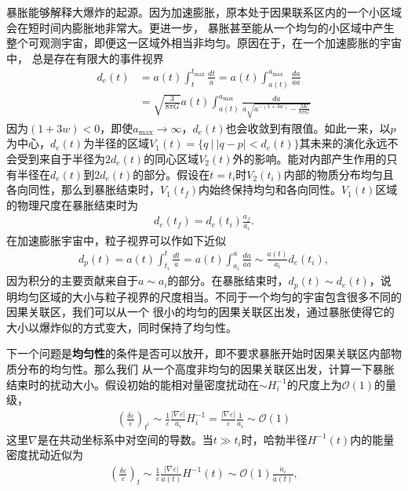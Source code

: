 暴胀能够解释大爆炸的起源。因为加速膨胀，原本处于因果联系区内的一个小区域会在短时间内膨胀地非常大。更进一步，
暴胀甚至能从一个均匀的小区域中产生整个可观测宇宙，即便这一区域外相当非均匀。原因在于，在一个加速膨胀的宇宙中，
总是存在有限大的事件视界
\begin{equation}
  \begin{split}
    d_{e}(t) &= a(t)\int_t^{t_{\text{max}}} \frac{dt}{a}
    =a(t)\int_{a(t)}^{a_{\text{max}}} \frac{da}{\dot{a}a} \\
    &= \sqrt{\frac{3}{8\pi G}}a(t)\int_{a(t)}^{a_{\text{max}}}
    \frac{da}{a\sqrt{a^{-(1+3w)}-\frac{3K}{8\pi G}}} 
  \end{split}
\end{equation}
因为${\left(1+3w\right)}<0$，即使$a_{\text{max}}\rightarrow
\infty$，$d_{e}(t)$也会收敛到有限值。如此一来，以$
p$为中心，$d_{e}(t)$为半径的区域$V_1(t)=\{q\ |\
|q-p|<d_{e}(t)\}$其未来的演化永远不会受到来自于半径为$2d_{e}(t)$的同心区域$V_2(t)$外的影响。能对内部产生作用的只有半径在$d_{e}(t)$到$2d_{e}(t)$的部分。假设在$t=t_{i}$时$V_2(t_{i})$内部的物质分布均匀且各向同性，那么到暴胀结束时，$V_1(t_{f})$内始终保持均匀和各向同性。$V_1(t)$区域的物理尺度在暴胀结束时为
\begin{align}
  d_{e}(t_{f})=d_e(t_{i}) \frac{a_{f}}{a_{i}}.
\end{align}
在加速膨胀宇宙中，粒子视界可以作如下近似
\begin{align}
  d_{p}(t) =a(t)\int_{t_{i}}^{t} \frac{dt}{a}=a(t)\int_{a_{i}}^{a}
  \frac{da}{\dot{a}a}\sim \frac{a(t)}{a_{i}}d_{e}(t_i),  
\end{align}
因为积分的主要贡献来自于$a\sim a_{i}$的部分。在暴胀结束时，$d_{p}(t)\sim
d_{e}(t)$，说明均匀区域的大小与粒子视界的尺度相当。不同于一个均匀的宇宙包含很多不同的因果关联区，我们可以从一个
很小的均匀的因果关联区出发，通过暴胀使得它的大小以爆炸似的方式变大，同时保持了均匀性。

下一个问题是\textbf{均匀性}的条件是否可以放开，即不要求暴胀开始时因果关联区内部物质分布的均匀性。那么我们
从一个高度非均匀的因果关联区出发，计算一下暴胀结束时的扰动大小。假设初始的能相对量密度扰动在$\sim
H_{i}^{-1}$的尺度上为$\mathcal{O}(1)$的量级，
\begin{align}
  {\left(\frac{\delta \varepsilon}{\varepsilon}\right)}_{t^{i}}
  \sim \frac{1}{\varepsilon} \frac{|\nabla\varepsilon|}{a_{i}}H_{i}^{-1}
  =\frac{|\nabla\varepsilon|}{\varepsilon}\frac{1}{\dot{a}_{i}}
  \sim \mathcal{O}(1)
\end{align}
这里$\nabla$是在共动坐标系中对空间的导数。当$t\gg
t_{i}$时，哈勃半径$H^{-1}(t)$内的能量密度扰动近似为
\begin{align}
  \label{eq:relative-energy-density-perturbation}
  {\left(\frac{\delta\varepsilon}{\varepsilon}\right)}_{t}
  \sim \frac{1}{\varepsilon} \frac{|\nabla\varepsilon|}{a(t)}H^{-1}(t)
  \sim \mathcal{O}(1) \frac{\dot{a}_{i}}{\dot{a}(t)},
\end{align}

